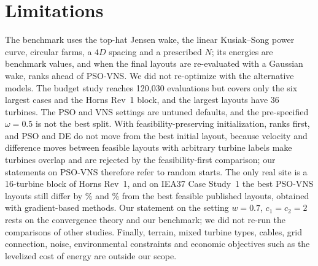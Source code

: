 \section{Limitations}
\label{sec:limits}
The benchmark uses the top-hat Jensen wake, the linear Kusiak--Song power curve, circular farms, a $4D$ spacing and a prescribed $N$; its energies are benchmark values, and when the final layouts are re-evaluated with a Gaussian wake, \NBestGauss{} ranks ahead of PSO-VNS. We did not re-optimize with the alternative models.
The budget study reaches 120,030 evaluations but covers only the six largest cases and the Horns Rev~1 block, and the largest layouts have 36 turbines. The PSO and VNS settings are untuned defaults, and the pre-specified $\omega=0.5$ is not the best split.
With feasibility-preserving initialization, \NFbFeasBestRank{} ranks first, and PSO and DE do not move from the best initial layout, because velocity and difference moves between feasible layouts with arbitrary turbine labels make turbines overlap and are rejected by the feasibility-first comparison; our statements on PSO-VNS therefore refer to random starts. The only real site is a 16-turbine block of Horns Rev~1, and on IEA37 Case Study~1 the best PSO-VNS layouts still differ by \NIEAGapSixteenThirtyK\% and \NIEAGapThirtySixThirtyK\% from the best feasible published layouts, obtained with gradient-based methods. Our statement on the setting $w=0.7$, $c_1=c_2=2$ rests on the convergence theory and our benchmark; we did not re-run the comparisons of other studies. Finally, terrain, mixed turbine types, cables, grid connection, noise, environmental constraints and economic objectives such as the levelized cost of energy are outside our scope.

